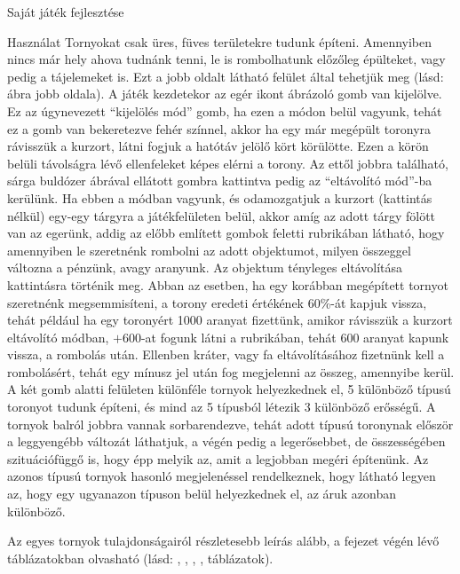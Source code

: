 \begin{MyChapter}{Saját játék fejlesztése}
\begin{MySection}{Használat}
		Tornyokat csak üres, füves területekre tudunk építeni. Amennyiben nincs már hely ahova tudnánk tenni, le is rombolhatunk előzőleg épülteket, vagy pedig a tájelemeket is. Ezt a jobb oldalt látható felület által tehetjük meg (lásd:  ábra jobb oldala).		
		A játék kezdetekor az egér ikont ábrázoló gomb van kijelölve. Ez az úgynevezett ``kijelölés mód'' gomb, ha ezen a módon belül vagyunk, tehát ez a gomb van bekeretezve fehér színnel, akkor ha egy már megépült toronyra rávisszük a kurzort, látni fogjuk a hatótáv jelölő kört körülötte. Ezen a körön belüli távolságra lévő ellenfeleket képes elérni a torony. %
		Az ettől jobbra található, sárga buldózer ábrával ellátott gombra kattintva pedig az ``eltávolító mód''-ba kerülünk. Ha ebben a módban vagyunk, és odamozgatjuk a kurzort (kattintás nélkül) egy-egy tárgyra a játékfelületen belül, akkor amíg az adott tárgy fölött van az egerünk, addig az előbb említett gombok feletti rubrikában látható, hogy amennyiben le szeretnénk rombolni az adott objektumot, milyen összeggel változna a pénzünk, avagy aranyunk. Az objektum tényleges eltávolítása kattintásra történik meg.
		Abban az esetben, ha egy korábban megépített tornyot szeretnénk megsemmisíteni, a torony eredeti értékének 60\%-át kapjuk vissza, tehát például ha egy toronyért 1000 aranyat fizettünk, amikor rávisszük a kurzort eltávolító módban, $+600$-at fogunk látni a rubrikában, tehát 600 aranyat kapunk vissza, a rombolás után. Ellenben kráter, vagy fa eltávolításához fizetnünk kell a rombolásért, tehát egy mínusz jel után fog megjelenni az összeg, amennyibe kerül.
		A két gomb alatti felületen különféle tornyok helyezkednek el, 5 különböző típusú toronyot tudunk építeni, és mind az 5 típusból létezik 3 különböző erősségű.
		A tornyok balról jobbra vannak sorbarendezve, tehát adott típusú toronynak először a leggyengébb változát láthatjuk, a végén pedig a legerősebbet, de összességében szituációfüggő is, hogy épp melyik az, amit a legjobban megéri építenünk. Az azonos típusú tornyok hasonló megjelenéssel rendelkeznek, hogy látható legyen az, hogy egy ugyanazon típuson belül helyezkednek el, az áruk azonban különböző.
		
		Az egyes tornyok tulajdonságairól részletesebb leírás alább, a fejezet végén lévő táblázatokban olvasható (lásd: , , , ,  táblázatok).
		

\end{MySection}
\end{MyChapter}
